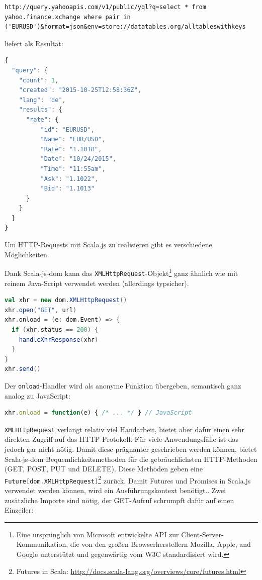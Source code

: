\documentclass[a4paper, 12pt, hidelinks, listof=totoc, listoftables=totoc, bibliography=totoc]{scrreprt}
\newcommand{\code}[1]{\lstinline[language=Scala, style=inline]|#1|}
\newcommand{\scala}[1]{\lstinline[language=Scala, style=inline]|#1|}
\begin{document}
\begin{lstlisting}[aboveskip=0pt, style=snippet]
http://query.yahooapis.com/v1/public/yql?q=select * from yahoo.finance.xchange where pair in ('EURUSD')&format=json&env=store://datatables.org/alltableswithkeys
\end{lstlisting}

liefert als Resultat:

\begin{lstlisting}[language=JavaScript, style=snippet]
{
  "query": {
    "count": 1,
    "created": "2015-10-25T12:58:36Z",
    "lang": "de",
    "results": {
      "rate": {
          "id": "EURUSD",
          "Name": "EUR/USD",
          "Rate": "1.1018",
          "Date": "10/24/2015",
          "Time": "11:55am",
          "Ask": "1.1022",
          "Bid": "1.1013"
      }
    }
  }
}
\end{lstlisting}

Um HTTP-Requests mit Scala.js zu realisieren gibt es verschiedene Möglichkeiten\cite[\#UsingWebServices]{haoyi.HOS}.

Dank Scala-js-dom kann das \code{XMLHttpRequest}-Objekt\footnote{Eine ursprünglich von Microsoft entwickelte \ac{API} zur Client-Server-Kommunikation, die von den großen Browserherstellern Mozilla, Apple, and Google unterstützt und gegenwärtig vom W3C standardisiert wird.\cite{mdn.XHR}} ganz ähnlich wie mit reinem Java-Script verwendet werden (allerdings typsicher).

\begin{lstlisting}[language=Scala, caption={HTTP-Aufruf mit XMLHttpRequest.}]
val xhr = new dom.XMLHttpRequest()
xhr.open("GET", url)
xhr.onload = (e: dom.Event) => {
  if (xhr.status == 200) {
    handleXhrResponse(xhr)
  }
}
xhr.send()
\end{lstlisting}

Der \scala{onload}-Handler wird als anonyme Funktion übergeben, semantisch ganz analog zu JavaScript:

\begin{lstlisting}[language=JavaScript, style=snippet]
xhr.onload = function(e) { /* ... */ } // JavaScript
\end{lstlisting}

\code{XMLHttpRequest} verlangt relativ viel Handarbeit, bietet aber dafür einen sehr direkten Zugriff auf das HTTP-Protokoll. Für viele Anwendungsfälle ist das jedoch gar nicht nötig. Damit diese prägnanter geschrieben werden können, bietet Scala-js-dom Bequemlichkeitsmethoden für die gebräuchlichsten HTTP-Methoden (GET, POST, PUT und DELETE). Diese Methoden geben eine \scala{Future[dom.XMLHttpRequest]}\footnote{Futures in Scala: \url{http://docs.scala-lang.org/overviews/core/futures.html}} zurück. Damit Futures und Promises in Scala.js verwendet werden können, wird ein Ausführungskontext benötigt.. \cite[\#Extensions]{scala-js-dom.DOC} Zwei zusätzliche Importe sind nötig, der GET-Aufruf schrumpft dafür auf einen Einzeiler:
\end{document}
